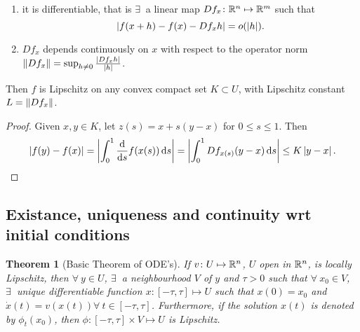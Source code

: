 \documentclass{notes}
\theoremstyle{plain}
\newtheorem*{theorem}{Theorem}
\begin{document}
\begin{enumerate}
\item it is differentiable, that is $\exists\ $ a linear map $Df_x \colon
  \mathbb{R}^n \mapsto \mathbb{R}^m$ such that
\[
\left|f(x+h) - f(x) - Df_x h\right| = o(\left|h\right|).
\]
\item $Df_x$ depends continuously on $x$ with respect to the operator
  norm $\left\|Df_x\right\| = \sup_{h \ne 0} \frac{\left|Df_x h\right|}{\left|h\right|}$.
\end{enumerate}

Then $f$ is Lipschitz on any convex compact set $K \subset U$, with
Lipschitz constant $L = \left\|Df_x\right\|$.

\begin{proof}
  Given $x,y \in K$, let $z(s) = x + s(y-x)$ for $0 \le s \le 1$.
  Then
\[
\left|f(y) - f(x)\right| = \left|\int_0^1 \frac{\mathrm{d}}{\mathrm{d} s} f(x(s))\,\mathrm{d} s\right| =
\left|\int_0^1 Df_{x(s)} (y-x)\,\mathrm{d} s\right| \le K \left|y-x\right|.
\]
\end{proof}

\subsection{Existance, uniqueness and continuity wrt initial conditions}

\begin{theorem}[Basic Theorem of ODE's]
  If $v \colon U \mapsto \mathbb{R}^n$, $U$ open in $\mathbb{R}^n$, is locally Lipschitz,
  then $\forall\ y \in U$, $\exists\ $ a neighbourhood $V$ of $y$ and
  $\tau > 0$ such that $\forall\ x_0 \in V$, $\exists\ $ unique
  differentiable function $x \colon \left[ -\tau, \tau \right] \mapsto U$
  such that $x(0) = x_0$ and $\dot{x}(t) = v\left(x(t)\right) \forall\ 
  t \in \left[ -\tau, \tau \right]$.  Furthermore, if the solution
  $x(t)$ is denoted by $\phi_t(x_0)$, then $\phi \colon \left[ -\tau, \tau
  \right] \times V \mapsto U$ is Lipschitz.
\end{theorem}
\end{document}
